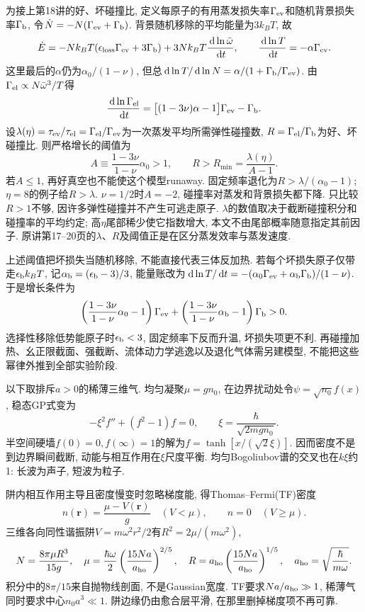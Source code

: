 为接上第18讲的好、坏碰撞比, 定义每原子的有用蒸发损失率$\Gamma_{\rm ev}$和随机背景损失率$\Gamma_{\rm b}$, 令$\dot N=-N(\Gamma_{\rm ev}+\Gamma_{\rm b})$. 背景随机移除的平均能量为$3k_BT$, 故
\[\dot E=-Nk_BT(\epsilon_{\rm loss}\Gamma_{\rm ev}+3\Gamma_{\rm b})
              +3Nk_BT\frac{\,\mathrm d\ln\bar\omega}{\,\mathrm d t},\qquad
 \frac{\,\mathrm d\ln T}{\,\mathrm d t}=-\alpha\Gamma_{\rm ev}.\]
这里最后的$\alpha$仍为$\alpha_0/(1-\nu)$, 但总$\,\mathrm d\ln T/\,\mathrm d\ln N=\alpha/(1+\Gamma_{\rm b}/\Gamma_{\rm ev})$. 由$\Gamma_{\rm el}\propto N\bar\omega^3/T$得
\[\frac{\,\mathrm d\ln\Gamma_{\rm el}}{\,\mathrm d t}
 =\big[(1-3\nu)\alpha-1\big]\Gamma_{\rm ev}-\Gamma_{\rm b}.\]
设$\lambda(\eta)=\tau_{\rm ev}/\tau_{\rm el}=\Gamma_{\rm el}/\Gamma_{\rm ev}$为一次蒸发平均所需弹性碰撞数, $R=\Gamma_{\rm el}/\Gamma_{\rm b}$为好、坏碰撞比. 则严格增长的阈值为
\[A\equiv\frac{1-3\nu}{1-\nu}\alpha_0>1,\qquad
 R>R_{\min}=\frac{\lambda(\eta)}{A-1}.\]
若$A\le1$, 再好真空也不能使这个模型runaway. 固定频率退化为$R>\lambda/(\alpha_0-1)$; $\eta=8$的例子给$R>\lambda$. $\nu=1/2$时$A=-2$, 碰撞率对蒸发和背景损失都下降. 只比较$R>1$不够, 因许多弹性碰撞并不产生可逃走原子. $\lambda$的数值取决于截断碰撞积分和碰撞率的平均约定; 高$\eta$尾部稀少使它指数增大, 本文不由尾部概率随意指定其前因子. 原讲第17--20页的$\lambda$、$R$及阈值正是在区分蒸发效率与蒸发速度.

上述阈值把坏损失当随机移除, 不能直接代表三体反加热. 若每个坏损失原子仅带走$\epsilon_{\rm b}k_BT$, 记$\alpha_{\rm b}=(\epsilon_{\rm b}-3)/3$, 能量账改为$\,\mathrm d\ln T/\,\mathrm d t=-(\alpha_0\Gamma_{\rm ev}+\alpha_{\rm b}\Gamma_{\rm b})/(1-\nu)$. 于是增长条件为
\[\left(\frac{1-3\nu}{1-\nu}\alpha_0-1\right)\Gamma_{\rm ev}
 +\left(\frac{1-3\nu}{1-\nu}\alpha_{\rm b}-1\right)\Gamma_{\rm b}>0.\]
选择性移除低势能原子时$\epsilon_{\rm b}<3$, 固定频率下反而升温, 坏损失项更不利. 再碰撞加热、幺正限截面、强截断、流体动力学逃逸以及退化气体需另建模型, 不能把这些幂律外推到全部实验阶段.

以下取排斥$a>0$的稀薄三维气. 均匀凝聚$\mu=gn_0$, 在边界扰动处令$\psi=\sqrt{n_0}f(x)$, 稳态GP式变为
\[-\xi^2 f''+(f^2-1)f=0,\qquad
 \xi=\frac{\hbar}{\sqrt{2mgn_0}}.\]
半空间硬墙$f(0)=0,f(\infty)=1$的解为$f=\tanh[x/(\sqrt2\xi)]$. 因而密度不是到边界瞬间截断, 动能与相互作用在$\xi$尺度平衡. 均匀Bogoliubov谱的交叉也在$k\xi$约1: 长波为声子, 短波为粒子.

阱内相互作用主导且密度慢变时忽略梯度能, 得Thomas--Fermi(TF)密度
\[n(\mathbf r)=\frac{\mu-V(\mathbf r)}g\quad(V<\mu),\qquad n=0\quad(V\ge\mu).\]
三维各向同性谐振阱$V=m\omega^2r^2/2$有$R^2=2\mu/(m\omega^2)$,
\[N=\frac{8\pi\mu R^3}{15g},\quad
 \mu=\frac{\hbar\omega}{2}\left(\frac{15Na}{a_{\rm ho}}\right)^{2/5},\quad
 R=a_{\rm ho}\left(\frac{15Na}{a_{\rm ho}}\right)^{1/5},
 \quad a_{\rm ho}=\sqrt{\frac{\hbar}{m\omega}}.\]
积分中的$8\pi/15$来自抛物线剖面, 不是Gaussian宽度. TF要求$Na/a_{\rm ho}\gg1$, 稀薄气同时要求中心$n_0a^3\ll1$. 阱边缘仍由愈合层平滑, 在那里删掉梯度项不再可靠.

